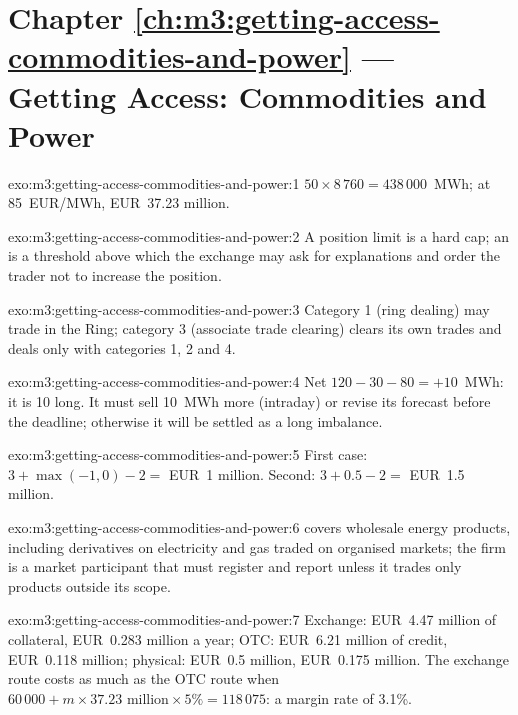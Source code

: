 \section*{Chapter \ref{ch:m3:getting-access-commodities-and-power} --- Getting Access: Commodities and Power}

\begin{solution}{exo:m3:getting-access-commodities-and-power:1}
$50 \times 8\,760 = 438\,000$~MWh; at \qty{85}{EUR/MWh}, EUR~37.23 million.
\end{solution}

\begin{solution}{exo:m3:getting-access-commodities-and-power:2}
A position limit is a hard cap; an  is a threshold above which the exchange may ask for
explanations and order the trader not to increase the position.
\end{solution}

\begin{solution}{exo:m3:getting-access-commodities-and-power:3}
Category 1 (ring dealing) may trade in the Ring; category 3 (associate trade clearing) clears its own trades
and deals only with categories 1, 2 and 4.
\end{solution}

\begin{solution}{exo:m3:getting-access-commodities-and-power:4}
Net $120 - 30 - 80 = +10$~MWh: it is 10 long. It must sell 10~MWh more (intraday) or revise its forecast
before the deadline; otherwise it will be settled as a long imbalance.
\end{solution}

\begin{solution}{exo:m3:getting-access-commodities-and-power:5}
First case: $3 + \max(-1, 0) - 2 = $ EUR~1 million. Second: $3 + 0.5 - 2 = $ EUR~1.5 million.
\end{solution}

\begin{solution}{exo:m3:getting-access-commodities-and-power:6}
 covers wholesale energy products, including derivatives on electricity and gas traded on organised
markets; the firm is a market participant that must register and report unless it trades only products
outside its scope.
\end{solution}

\begin{solution}{exo:m3:getting-access-commodities-and-power:7}
Exchange: EUR~4.47 million of collateral, EUR~0.283 million a year; OTC: EUR~6.21 million of credit, EUR~0.118
million; physical: EUR~0.5 million, EUR~0.175 million. The exchange route costs as much as the OTC route when
$60\,000 + m \times 37.23\text{ million} \times 5\% = 118\,075$: a margin rate of 3.1\%.
\end{solution}

